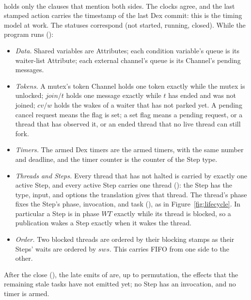 \paragraph{} holds only the clauses that mention both sides.
The clocks agree, and the last stamped \Lang{} action carries the timestamp
of the last Dex commit: this is the timing model at work. The statuses
correspond (not started, running, closed). While the program runs
():
\begin{itemize}
\item \emph{Data.} Shared variables are Attributes; each condition
  variable's queue is its waiter-list Attribute; each external channel's
  queue is its Channel's pending messages.
\item \emph{Tokens.} A mutex's token Channel holds one token exactly while
  the mutex is unlocked; $\mathit{join}/t$ holds one message exactly while
  $t$ has ended and was not joined; $\mathit{cv}/w$ holds the wakes of a
  waiter that has not parked yet. A pending cancel request means the flag
  is set; a set flag means a pending request, or a thread that has observed
  it, or an ended thread that no live thread can still fork.
\item \emph{Timers.} The armed Dex timers are the armed \Lang{} timers,
  with the same number and deadline, and the timer counter is the counter
  of the  Step type.
\item \emph{Threads and Steps.} Every thread that has not halted is carried
  by exactly one active Step, and every active Step carries one thread
  (): the Step has the type, input, and options the
  translation gives that thread. The thread's phase fixes the Step's phase,
  invocation, and task (), as in
  Figure~\ref{fig:lifecycle}. In particular a Step is in phase
  $\mathit{WT}$ exactly while its thread is blocked, so a publication wakes
  a Step exactly when it wakes the thread.
\item \emph{Order.} Two blocked threads are ordered by their blocking
  stamps as their Steps' waits are ordered by $\mathit{sws}$. This carries
  FIFO from one side to the other.
\end{itemize}
After the close (), the late emits of \Lang{} are, up to
permutation, the effects that the remaining stale tasks have not emitted
yet; no Step has an invocation, and no timer is armed.

